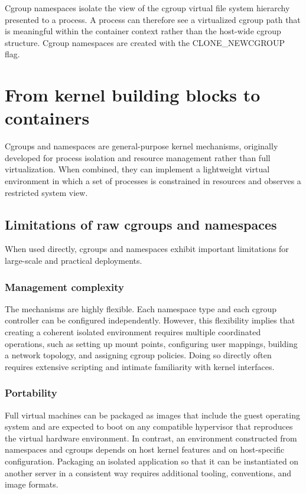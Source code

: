 \documentclass[11pt,a4paper,openany]{report}
\begin{document}
Cgroup namespaces isolate the view of the cgroup virtual file system hierarchy presented to a process. A process can therefore see a virtualized cgroup path that is meaningful within the container context rather than the host-wide cgroup structure. Cgroup namespaces are created with the CLONE\_NEWCGROUP flag.

\section{From kernel building blocks to containers}

Cgroups and namespaces are general-purpose kernel mechanisms, originally developed for process isolation and resource management rather than full virtualization. When combined, they can implement a lightweight virtual environment in which a set of processes is constrained in resources and observes a restricted system view.

\subsection{Limitations of raw cgroups and namespaces}

When used directly, cgroups and namespaces exhibit important limitations for large-scale and practical deployments.

\subsubsection*{Management complexity}

The mechanisms are highly flexible. Each namespace type and each cgroup controller can be configured independently. However, this flexibility implies that creating a coherent isolated environment requires multiple coordinated operations, such as setting up mount points, configuring user mappings, building a network topology, and assigning cgroup policies. Doing so directly often requires extensive scripting and intimate familiarity with kernel interfaces.

\subsubsection*{Portability}

Full virtual machines can be packaged as images that include the guest operating system and are expected to boot on any compatible hypervisor that reproduces the virtual hardware environment. In contrast, an environment constructed from namespaces and cgroups depends on host kernel features and on host-specific configuration. Packaging an isolated application so that it can be instantiated on another server in a consistent way requires additional tooling, conventions, and image formats.
\end{document}
